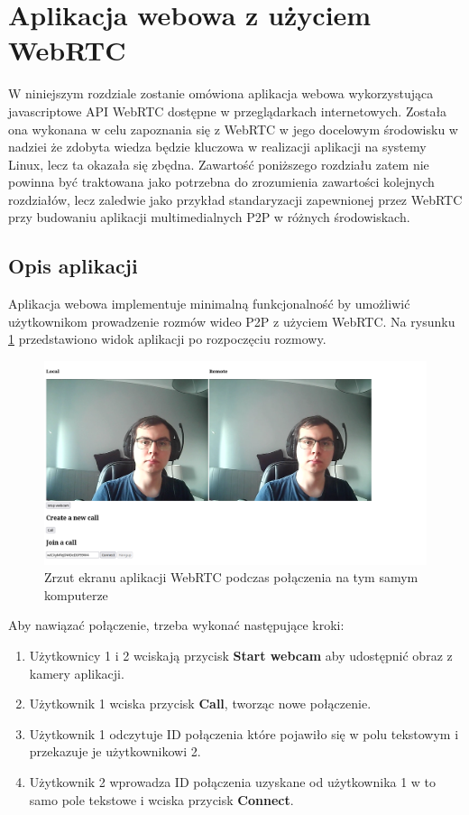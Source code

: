 \section{Aplikacja webowa z użyciem WebRTC}

W niniejszym rozdziale zostanie omówiona aplikacja webowa wykorzystująca javascriptowe API WebRTC
dostępne w przeglądarkach internetowych. Została ona wykonana w celu zapoznania się z WebRTC w jego
docelowym środowisku w nadziei że zdobyta wiedza będzie kluczowa w realizacji aplikacji na systemy
Linux, lecz ta okazała się zbędna. Zawartość poniższego rozdziału zatem nie powinna być traktowana
jako potrzebna do zrozumienia zawartości kolejnych rozdziałów, lecz zaledwie jako przykład
standaryzacji zapewnionej przez WebRTC przy budowaniu aplikacji multimedialnych P2P w różnych
środowiskach.

\subsection{Opis aplikacji}

Aplikacja webowa implementuje minimalną funkcjonalność by umożliwić użytkownikom prowadzenie rozmów
wideo P2P z użyciem WebRTC. Na rysunku \ref{fig:webrtc_app} przedstawiono widok aplikacji po
rozpoczęciu rozmowy.

\begin{figure}[htbp]
    \centering
    \includegraphics[width=\textwidth]{img/webrtc-app}
    \caption{Zrzut ekranu aplikacji WebRTC podczas połączenia na tym samym komputerze}
    \label{fig:webrtc_app}
\end{figure}

Aby nawiązać połączenie, trzeba wykonać następujące kroki:

\begin{enumerate}
    \item Użytkownicy 1 i 2 wciskają przycisk \textbf{Start webcam} aby udostępnić obraz z kamery
          aplikacji.
    \item Użytkownik 1 wciska przycisk \textbf{Call}, tworząc nowe połączenie.
    \item Użytkownik 1 odczytuje ID połączenia które pojawiło się w polu tekstowym i przekazuje je
          użytkownikowi 2.
    \item Użytkownik 2 wprowadza ID połączenia uzyskane od użytkownika 1 w to samo pole tekstowe i
          wciska przycisk \textbf{Connect}.
\end{enumerate}

